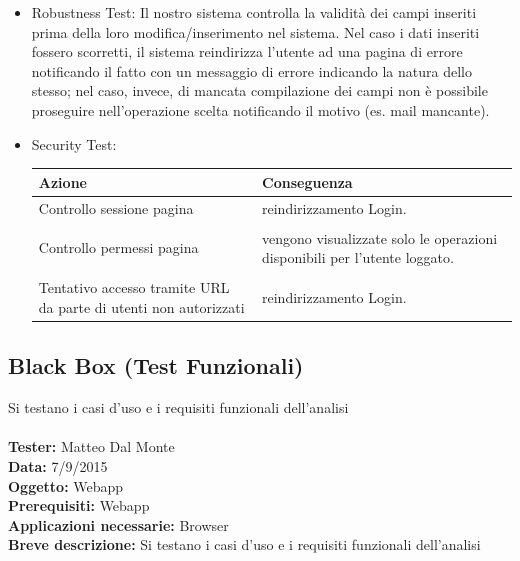 \documentclass[a4paper,12pt]{article}
\begin{document}
\begin{itemize}	

\item Robustness Test:
Il nostro sistema controlla la validità dei campi inseriti prima della loro modifica/inserimento nel sistema.
Nel caso i dati inseriti fossero scorretti, il sistema reindirizza l'utente ad una pagina di errore notificando il fatto con un messaggio di errore indicando la natura dello stesso; nel caso, invece, di mancata compilazione dei campi non è possibile proseguire nell'operazione scelta notificando il motivo (es. mail mancante).
\item Security Test:
\begin{table}[ht]
\begin{center}
\begin{tabular}{p{6.5cm} | p{6.5cm}}
\rowcolor{Ash}
\hline
Azione & Conseguenza \\ \hline
Controllo sessione pagina & reindirizzamento Login. \\
\vspace{0.2cm}\\
Controllo permessi pagina & vengono visualizzate solo le operazioni disponibili per l'utente loggato. \\
\vspace{0.2cm}\\
Tentativo accesso tramite URL da parte di utenti non autorizzati & reindirizzamento Login. \\ \hline
\end{tabular}
\end{center}
\end{table}

\end{itemize}

\pagebreak

\subsection{Black Box (Test Funzionali)}
Si testano i casi d'uso e i requisiti funzionali dell'analisi\\ \\
\textbf{Tester:} Matteo Dal Monte\\
\textbf{Data:} 7/9/2015\\
\textbf{Oggetto:} Webapp\\
\textbf{Prerequisiti:} Webapp\\
\textbf{Applicazioni necessarie:} Browser\\
\textbf{Breve descrizione:} Si testano i casi d'uso e i requisiti funzionali dell'analisi\\
\end{document}
